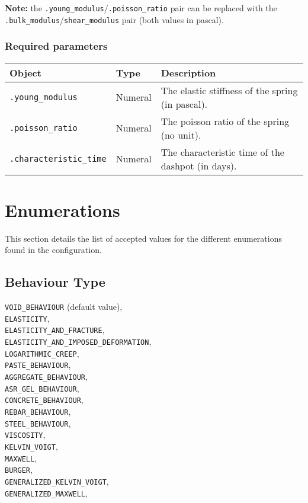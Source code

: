 \documentclass[10pt]{article}
\begin{document}
\textbf{Note:} the \verb+.young_modulus+/\verb+.poisson_ratio+ pair can be replaced with the \verb+.bulk_modulus+/\verb+shear_modulus+ pair (both values in pascal).

\subsubsection*{Required parameters}

\begin{tabularx}{\textwidth}{llX}
\hline 
Object & Type & Description \\ 
\hline 
\verb+.young_modulus+ & Numeral & The elastic stiffness of the spring (in pascal).\\
\verb+.poisson_ratio+ & Numeral & The poisson ratio of the spring (no unit).\\
\verb+.characteristic_time+ & Numeral & The characteristic time of the dashpot (in days).\\
\hline 
\end{tabularx}






\section{Enumerations}

This section details the list of accepted values for the different enumerations found in the configuration.

\subsection{Behaviour Type}

	\verb+VOID_BEHAVIOUR+ (default value),\\
	\verb+ELASTICITY+,\\
	\verb+ELASTICITY_AND_FRACTURE+,\\
	\verb+ELASTICITY_AND_IMPOSED_DEFORMATION+,\\
	\verb+LOGARITHMIC_CREEP+,\\
	\verb+PASTE_BEHAVIOUR+,\\
	\verb+AGGREGATE_BEHAVIOUR+,\\
	\verb+ASR_GEL_BEHAVIOUR+,\\
	\verb+CONCRETE_BEHAVIOUR+,\\
	\verb+REBAR_BEHAVIOUR+,\\
	\verb+STEEL_BEHAVIOUR+,\\
	\verb+VISCOSITY+,\\
	\verb+KELVIN_VOIGT+,\\
	\verb+MAXWELL+,\\
	\verb+BURGER+,\\
	\verb+GENERALIZED_KELVIN_VOIGT+,\\
	\verb+GENERALIZED_MAXWELL+,\\
	
\end{document}
